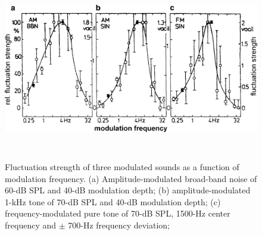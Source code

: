 \documentclass[a4paper]{article}
\begin{document}
\begin{figure}[ht]
    \centering
    \includegraphics[height=8cm]
        {book/img/Mueller2012Handbook-FluctuationStrengthVsModulationFrequency}
    \caption{Fluctuation strength of three modulated sounds as a function of
        modulation frequency. (a) Amplitude-modulated broad-band noise of 60-dB
        SPL and 40-dB modulation depth; (b) amplitude-modulated 1-kHz tone of
        70-dB SPL and 40-dB modulation depth; (c) frequency-modulated pure tone
        of 70-dB SPL, 1500-Hz center frequency and $\pm$ 700-Hz frequency
        deviation; \cite[pp. 248]{Fastl2007Psychoacoustics}}
    \label{fig:flucstrenvmodfreq}
\end{figure}



\end{document}
